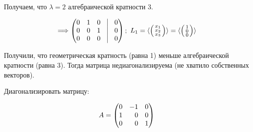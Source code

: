 Получаем, что $\lambda = 2$ алгебраической кратности 3.

$$\Longrightarrow
\begin{pmatrix}
0 & 1 & 0 & \vrule & 0\\
0 & 0 & 1 & \vrule & 0\\
0 & 0 & 0 & \vrule & 0\\
\end{pmatrix};
~L_1 = 
\langle
\left(
\begin{smallmatrix*}[c]
x_1\\ x_2\\ x_3\\ 
\end{smallmatrix*}
\right) 
\rangle=
\langle
\left(
\begin{smallmatrix*}[c]
1\\ 0\\ 0\\ 
\end{smallmatrix*}
\right) 
\rangle $$

Получили, что геометрическая кратность (равна 1) меньше алгебраической кратности (равна 3). Тогда матрица недиагонализируема (не хватило собственных векторов).    
\newpage
\begin{prim}
	Диагонализировать матрицу:
	
	$$A =
	\begin{pmatrix*}[r]
	0 & -1 & 0\\
	1 & 0  & 0\\
	0 & 0  & 1\\
	\end{pmatrix*}\\
	$$	
\end{prim}\\

